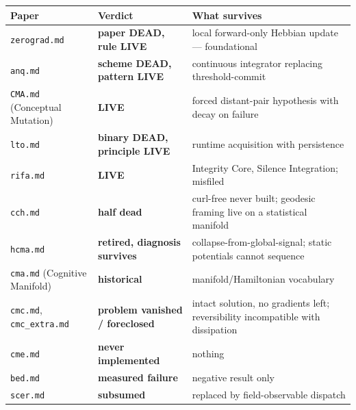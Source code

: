 \documentclass[
  11pt,
  a4paper,
]{article}
\begin{document}
\begin{longtable}[]{@{}
  >{\raggedright\arraybackslash}p{}
  >{\raggedright\arraybackslash}p{}
  >{\raggedright\arraybackslash}p{}@{}}
\toprule\noalign{}
\begin{minipage}[b]{\linewidth}\raggedright
Paper
\end{minipage} & \begin{minipage}[b]{\linewidth}\raggedright
Verdict
\end{minipage} & \begin{minipage}[b]{\linewidth}\raggedright
What survives
\end{minipage} \\
\midrule\noalign{}
\endhead
\bottomrule\noalign{}
\endlastfoot
\texttt{zerograd.md} & \textbf{paper DEAD, rule LIVE} & local
forward-only Hebbian update --- foundational \\
\texttt{anq.md} & \textbf{scheme DEAD, pattern LIVE} & continuous
integrator replacing threshold-commit \\
\texttt{CMA.md} (Conceptual Mutation) & \textbf{LIVE} & forced
distant-pair hypothesis with decay on failure \\
\texttt{lto.md} & \textbf{binary DEAD, principle LIVE} & runtime
acquisition with persistence \\
\texttt{rifa.md} & \textbf{LIVE} & Integrity Core, Silence Integration;
misfiled \\
\texttt{cch.md} & \textbf{half dead} & curl-free never built; geodesic
framing live on a statistical manifold \\
\texttt{hcma.md} & \textbf{retired, diagnosis survives} &
collapse-from-global-signal; static potentials cannot sequence \\
\texttt{cma.md} (Cognitive Manifold) & \textbf{historical} &
manifold/Hamiltonian vocabulary \\
\texttt{cmc.md}, \texttt{cmc\_extra.md} & \textbf{problem vanished /
foreclosed} & intact solution, no gradients left; reversibility
incompatible with dissipation \\
\texttt{cme.md} & \textbf{never implemented} & nothing \\
\texttt{bed.md} & \textbf{measured failure} & negative result only \\
\texttt{scer.md} & \textbf{subsumed} & replaced by field-observable
dispatch \\
\end{longtable}
\end{document}
